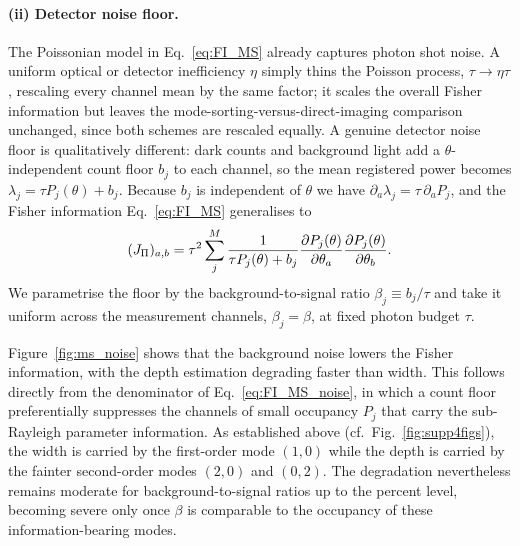 \documentclass[reprint,amsmath,amssymb,aps,prl,floatfix,groupedaddress,superscriptaddress]{revtex4-2}
\begin{document}
\paragraph{{\color{red}(ii) Detector noise floor.}}
{\color{red}
The Poissonian model in Eq.~\eqref{eq:FI_MS} already captures photon shot noise. A uniform optical or detector inefficiency $\eta$ simply thins the Poisson process, $\tau\to\eta\tau$, rescaling every channel mean by the same factor; it scales the overall Fisher information but leaves the mode-sorting-versus-direct-imaging comparison unchanged, since both schemes are rescaled equally. A genuine detector noise floor is qualitatively different: dark counts and background light add a $\theta$-independent count floor $b_j$ to each channel, so the mean registered power becomes $\lambda_j=\tau P_j(\theta)+b_j$. Because $b_j$ is independent of $\theta$ we have $\partial_a\lambda_j=\tau\,\partial_a P_j$, and the Fisher information Eq.~\eqref{eq:FI_MS} generalises to
\begin{equation}
({J_\Pi})_{a,b}=\tau^2\sum_j^M\frac{1}{\tau P_j(\theta)+b_j}\pdv{P_j(\theta)}{\theta_a}\pdv{P_j(\theta)}{\theta_b}.
\label{eq:FI_MS_noise}
\end{equation}
We parametrise the floor by the background-to-signal ratio $\beta_j\equiv b_j/\tau$ and take it uniform across the measurement channels, $\beta_j=\beta$, at fixed photon budget $\tau$.}

{\color{red}
Figure~\ref{fig:ms_noise} shows that the background noise lowers the Fisher information, with the depth estimation degrading faster than width. This follows directly from the denominator of Eq.~\eqref{eq:FI_MS_noise}, in which a count floor preferentially suppresses the channels of small occupancy $P_j$ that carry the sub-Rayleigh parameter information. As established above (cf.\ Fig.~\ref{fig:supp4figs}), the width is carried by the first-order mode $(1,0)$ while the depth is carried by the fainter second-order modes $(2,0)$ and $(0,2)$. The degradation nevertheless remains moderate for background-to-signal ratios up to the percent level, becoming severe only once $\beta$ is comparable to the occupancy of these information-bearing modes.}
\end{document}
